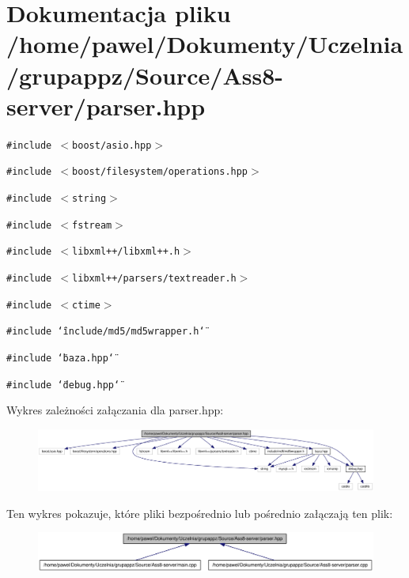 \hypertarget{a00015}{
\section{Dokumentacja pliku /home/pawel/Dokumenty/Uczelnia/grupappz/Source/Ass8-server/parser.hpp}
\label{dd/d1b/a00015}
}
{\tt \#include $<$boost/asio.hpp$>$}\par
{\tt \#include $<$boost/filesystem/operations.hpp$>$}\par
{\tt \#include $<$string$>$}\par
{\tt \#include $<$fstream$>$}\par
{\tt \#include $<$libxml++/libxml++.h$>$}\par
{\tt \#include $<$libxml++/parsers/textreader.h$>$}\par
{\tt \#include $<$ctime$>$}\par
{\tt \#include \char`\"{}include/md5/md5wrapper.h\char`\"{}}\par
{\tt \#include \char`\"{}baza.hpp\char`\"{}}\par
{\tt \#include \char`\"{}debug.hpp\char`\"{}}\par


Wykres zależności załączania dla parser.hpp:\nopagebreak
\begin{figure}[H]
\begin{center}
\leavevmode
\includegraphics[width=420pt]{d4/dca/a00048}
\end{center}
\end{figure}


Ten wykres pokazuje, które pliki bezpośrednio lub pośrednio załączają ten plik:\nopagebreak
\begin{figure}[H]
\begin{center}
\leavevmode
\includegraphics[width=372pt]{d2/dee/a00049}
\end{center}
\end{figure}
